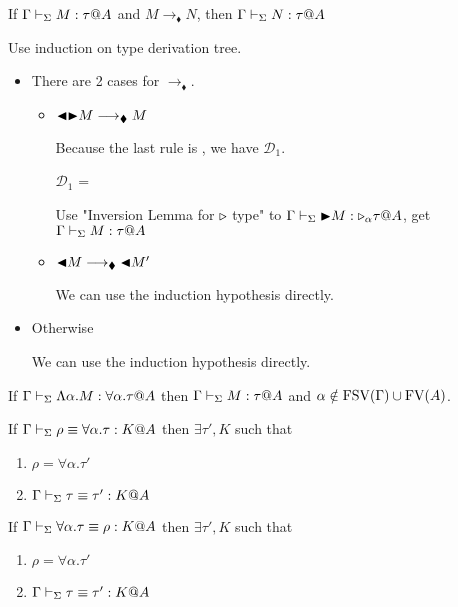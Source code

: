 \begin{theorem}
	If $\G\V M:\tau@A$ and $M\longrightarrow_\blacklozenge N$, then $\G\V N:\tau@A$\\
\end{theorem}

Use induction on type derivation tree.

\begin{itemize}
	\newcommand{\R}{\longrightarrow_{\blacklozenge}}
		
	\item \TTBL
	      	      
	      There are 2 cases for $\R$.
	      	      
	      \begin{itemize}
	      	\item $\TBL\TB M \R M$
	      	      	      	      
	      	      Because the last rule is \TTBL, we have $\mathcal{D}_1$.
	      	      	      	      
	      	      $\mathcal{D}_1$ = 
	      	      {}
	      	      	      	      
	      	      Use "Inversion Lemma for ${\mathop{\triangleright}}$ type" to $\Gamma \vdash_\Sigma {\mathop{\blacktriangleright}} M : {\mathop{\triangleright}}_\alpha \tau @A$,  get $\Gamma \vdash_\Sigma M : \tau @A$
	      	      	      	      
	      	\item $\TBL M \R \TBL M'$
	      	      	      	      
	      	      We can use the induction hypothesis directly.
	      \end{itemize}
	      	      
	\item Otherwise
	      	      
	      We can use the induction hypothesis directly.
\end{itemize}

\begin{lemma}
	\begin{item}
	      \item If $\G \V \Lambda\alpha.M : \forall\alpha.\tau@A$ then $\Gamma \vdash_\Sigma M : \tau @A$ and $\alpha \notin \text{FSV}(\Gamma) \cup \text{FV}(A)$.
	      \item If $\Gamma \vdash_\Sigma \rho \equiv \forall\alpha.\tau : K @A$ then $\exists \tau', K$ such that
	      \begin{enumerate}
	      	\item $\rho = \forall\alpha.\tau'$
	      	\item $\Gamma \vdash_\Sigma \tau \equiv \tau' : K @A$
	      \end{enumerate}
	      \item If $\Gamma \vdash_\Sigma \forall\alpha.\tau \equiv \rho : K @A$ then $\exists \tau', K$ such that
	      \begin{enumerate}
	      	\item $\rho = \forall\alpha.\tau'$
	      	\item $\Gamma \vdash_\Sigma \tau \equiv \tau' : K @A$
	      \end{enumerate}
	\end{item}
\end{lemma}

